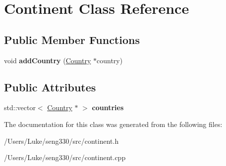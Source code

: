 \hypertarget{class_continent}{}\section{Continent Class Reference}
\label{class_continent}
\subsection*{Public Member Functions}
\begin{DoxyCompactItemize}
\item 
\hypertarget{class_continent_a734a82cb03fbd7edebd9088b72b75f9d}{}void {\bfseries add\+Country} (\hyperlink{class_country}{Country} $\ast$country)\label{class_continent_a734a82cb03fbd7edebd9088b72b75f9d}

\end{DoxyCompactItemize}
\subsection*{Public Attributes}
\begin{DoxyCompactItemize}
\item 
\hypertarget{class_continent_a095993408efbfeb34c4e9b6b649e7f20}{}std\+::vector$<$ \hyperlink{class_country}{Country} $\ast$ $>$ {\bfseries countries}\label{class_continent_a095993408efbfeb34c4e9b6b649e7f20}

\end{DoxyCompactItemize}


The documentation for this class was generated from the following files\+:\begin{DoxyCompactItemize}
\item 
/\+Users/\+Luke/seng330/src/continent.\+h\item 
/\+Users/\+Luke/seng330/src/continent.\+cpp\end{DoxyCompactItemize}
